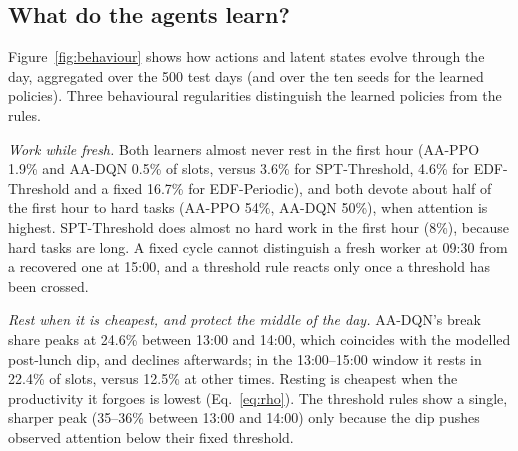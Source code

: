 \subsection{What do the agents learn?}\label{sec:behaviour}
Figure~\ref{fig:behaviour} shows how actions and latent states evolve through the day, aggregated over the 500 test days (and over the ten seeds for the learned policies). Three behavioural regularities distinguish the learned policies from the rules.

\emph{Work while fresh.} Both learners almost never rest in the first hour (AA-PPO 1.9\% and AA-DQN 0.5\% of slots, versus 3.6\% for SPT-Threshold, 4.6\% for EDF-Threshold and a fixed 16.7\% for EDF-Periodic), and both devote about half of the first hour to hard tasks (AA-PPO 54\%, AA-DQN 50\%), when attention is highest. SPT-Threshold does almost no hard work in the first hour (8\%), because hard tasks are long. A fixed cycle cannot distinguish a fresh worker at 09:30 from a recovered one at 15:00, and a threshold rule reacts only once a threshold has been crossed.

\emph{Rest when it is cheapest, and protect the middle of the day.} AA-DQN's break share peaks at 24.6\% between 13:00 and 14:00, which coincides with the modelled post-lunch dip, and declines afterwards; in the 13:00--15:00 window it rests in 22.4\% of slots, versus 12.5\% at other times. Resting is cheapest when the productivity it forgoes is lowest (Eq.~\eqref{eq:rho}).  The threshold rules show a single, sharper peak (35--36\% between 13:00 and 14:00) only because the dip pushes observed attention below their fixed threshold.


